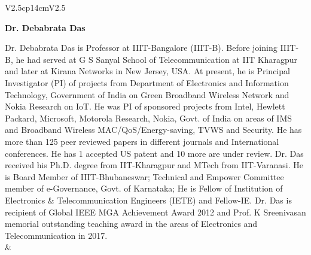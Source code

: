 \begin{tabular}{V{2.5}cp{14cm}V{2.5}}
\centerline{\large\bf Dr. Debabrata Das}

\bigskip
Dr. Debabrata Das is Professor at IIIT-Bangalore (IIIT-B). Before joining IIIT-B, he had served at G S Sanyal School of Telecommunication at IIT Kharagpur and later at Kirana Networks in New Jersey, USA. At present, he is Principal Investigator (PI) of projects from Department of Electronics and Information Technology, Government of India on Green Broadband Wireless Network and Nokia Research on IoT. He was PI of sponsored projects from Intel, Hewlett Packard, Microsoft, Motorola Research, Nokia, Govt. of India on areas of IMS and Broadband Wireless MAC/QoS/Energy-saving, TVWS and Security. He has more than 125 peer reviewed papers in different journals and International conferences. He has 1 accepted US patent and 10 more are under review. Dr. Das received his Ph.D. degree from IIT-Kharagpur and MTech from IIT-Varanasi. He is Board Member of IIIT-Bhubaneswar; Technical and Empower Committee member of e-Governance, Govt. of Karnataka; He is Fellow of Institution of Electronics \& Telecommunication Engineers (IETE) and Fellow-IE. Dr. Das is recipient of Global IEEE MGA Achievement Award 2012 and Prof. K Sreenivasan memorial outstanding teaching award in the areas of Electronics and Telecommunication in 2017.\\
&\\
\end{tabular}
